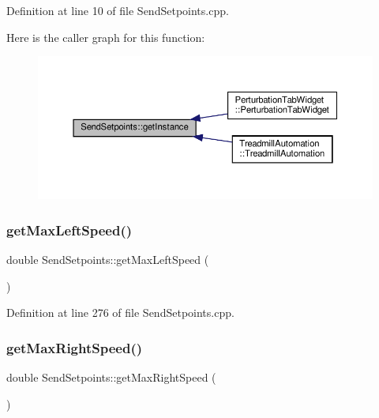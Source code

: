 Definition at line 10 of file Send\+Setpoints.\+cpp.

Here is the caller graph for this function\+:
\nopagebreak
\begin{figure}[H]
\begin{center}
\leavevmode
\includegraphics[width=350pt]{class_send_setpoints_ac69cc30ed614e18793b22ac9b63100fd_icgraph}
\end{center}
\end{figure}
\mbox{\label{class_send_setpoints_aad40e8adf6a8eb9954ecadaeddab9c87}} 
\subsubsection{\texorpdfstring{get\+Max\+Left\+Speed()}{getMaxLeftSpeed()}}
{\footnotesize\ttfamily double Send\+Setpoints\+::get\+Max\+Left\+Speed (\begin{DoxyParamCaption}{ }\end{DoxyParamCaption})}



Definition at line 276 of file Send\+Setpoints.\+cpp.

\mbox{\label{class_send_setpoints_a5605c2a0ea2e4aa514074aad3ac829c0}} 
\subsubsection{\texorpdfstring{get\+Max\+Right\+Speed()}{getMaxRightSpeed()}}
{\footnotesize\ttfamily double Send\+Setpoints\+::get\+Max\+Right\+Speed (\begin{DoxyParamCaption}{ }\end{DoxyParamCaption})}



